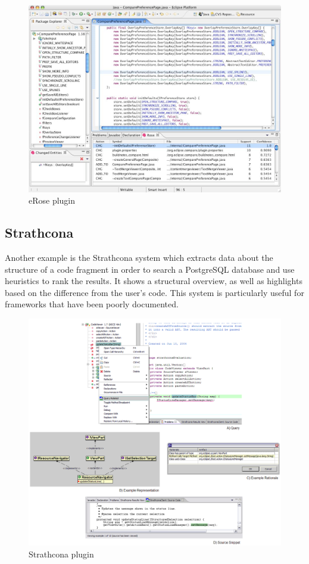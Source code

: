 \documentclass{l4proj}
\begin{document}
\begin{figure}[H]
\includegraphics[scale=0.4]{rose}
\centering
\caption{eRose plugin}\label{rose}
\label{fig:rose}
\end{figure}

\subsection{Strathcona}
Another example is the Strathcona system \cite{strathcona} which extracts data about the structure of a code fragment in order to search a PostgreSQL database and use heuristics to rank the results. It shows a structural overview, as well as highlights based on the difference from the user's code. This system is particularly useful for frameworks that have been poorly documented.

\begin{figure}[H]
\includegraphics[scale=0.26]{strathcona}
\centering
\caption{Strathcona plugin}\label{strathcona}
\label{fig:strathcona}
\end{figure}
\end{document}
